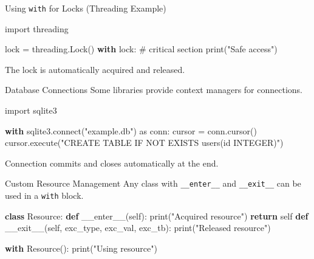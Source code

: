 \documentclass[
  letterpaper,
  DIV=11,
  numbers=noendperiod]{scrreprt}
\newenvironment{Shaded}{\begin{snugshade}}{\end{snugshade}}
\newcommand{\BuiltInTok}[1]{\textcolor[rgb]{0.00,0.23,0.31}{#1}}
\newcommand{\CommentTok}[1]{\textcolor[rgb]{0.37,0.37,0.37}{#1}}
\newcommand{\ControlFlowTok}[1]{\textcolor[rgb]{0.00,0.23,0.31}{\textbf{#1}}}
\newcommand{\ExtensionTok}[1]{\textcolor[rgb]{0.00,0.23,0.31}{#1}}
\newcommand{\FunctionTok}[1]{\textcolor[rgb]{0.28,0.35,0.67}{#1}}
\newcommand{\ImportTok}[1]{\textcolor[rgb]{0.00,0.46,0.62}{#1}}
\newcommand{\KeywordTok}[1]{\textcolor[rgb]{0.00,0.23,0.31}{\textbf{#1}}}
\newcommand{\NormalTok}[1]{\textcolor[rgb]{0.00,0.23,0.31}{#1}}
\newcommand{\OperatorTok}[1]{\textcolor[rgb]{0.37,0.37,0.37}{#1}}
\newcommand{\StringTok}[1]{\textcolor[rgb]{0.13,0.47,0.30}{#1}}
\newcommand{\VariableTok}[1]{\textcolor[rgb]{0.07,0.07,0.07}{#1}}
\begin{document}
Using \texttt{with} for Locks (Threading Example)

\begin{Shaded}
\begin{Highlighting}[]
\ImportTok{import}\NormalTok{ threading}

\NormalTok{lock }\OperatorTok{=}\NormalTok{ threading.Lock()}
\ControlFlowTok{with}\NormalTok{ lock:}
    \CommentTok{\# critical section}
    \BuiltInTok{print}\NormalTok{(}\StringTok{"Safe access"}\NormalTok{)}
\end{Highlighting}
\end{Shaded}

The lock is automatically acquired and released.

Database Connections Some libraries provide context managers for
connections.

\begin{Shaded}
\begin{Highlighting}[]
\ImportTok{import}\NormalTok{ sqlite3}

\ControlFlowTok{with}\NormalTok{ sqlite3.}\ExtensionTok{connect}\NormalTok{(}\StringTok{"example.db"}\NormalTok{) }\ImportTok{as}\NormalTok{ conn:}
\NormalTok{    cursor }\OperatorTok{=}\NormalTok{ conn.cursor()}
\NormalTok{    cursor.execute(}\StringTok{"CREATE TABLE IF NOT EXISTS users(id INTEGER)"}\NormalTok{)}
\end{Highlighting}
\end{Shaded}

Connection commits and closes automatically at the end.

Custom Resource Management Any class with \texttt{\_\_enter\_\_} and
\texttt{\_\_exit\_\_} can be used in a \texttt{with} block.

\begin{Shaded}
\begin{Highlighting}[]
\KeywordTok{class}\NormalTok{ Resource:}
    \KeywordTok{def} \FunctionTok{\_\_enter\_\_}\NormalTok{(}\VariableTok{self}\NormalTok{):}
        \BuiltInTok{print}\NormalTok{(}\StringTok{"Acquired resource"}\NormalTok{)}
        \ControlFlowTok{return} \VariableTok{self}
    \KeywordTok{def} \FunctionTok{\_\_exit\_\_}\NormalTok{(}\VariableTok{self}\NormalTok{, exc\_type, exc\_val, exc\_tb):}
        \BuiltInTok{print}\NormalTok{(}\StringTok{"Released resource"}\NormalTok{)}

\ControlFlowTok{with}\NormalTok{ Resource():}
    \BuiltInTok{print}\NormalTok{(}\StringTok{"Using resource"}\NormalTok{)}
\end{Highlighting}
\end{Shaded}
\end{document}
